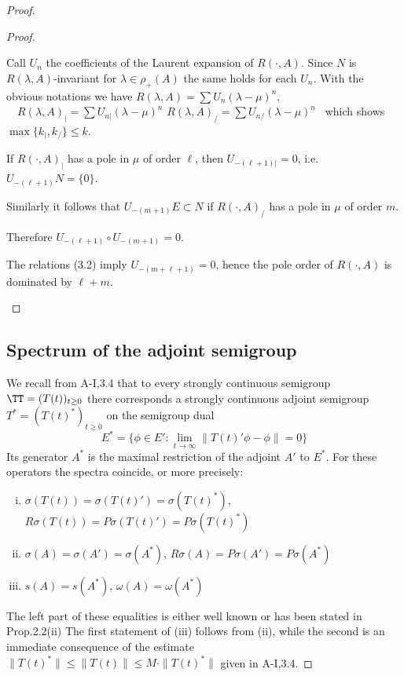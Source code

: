 \begin{proof}
\begin{proof}
\begin{enumerate}[(i)]
Call $U_{n}$ the coefficients of the Laurent expansion of $R(\cdot,A)$.
Since $N$ is $R(\lambda,A)$-invariant for $\lambda \in \rho_{+}(A)$ the same holds for each $U_{n}$.
With the obvious notations we have \quad
$R(\lambda,A) = \sum U_{n}(\lambda-\mu)^{n}$, $\quad R(\lambda,A)_{|} = \sum U_{n|}(\lambda-\mu)^{n}$ \quad {} \quad $R(\lambda,A)_{/} = \sum U_{n/}(\lambda-\mu)^{n}$~
which shows $\max\{k_{|},k_{/}\} \leq k$.

If $R(\cdot,A)_{|}$ has a pole in $\mu$ of order $\ell$, then $U_{-(\ell+1)|} = 0$, i.e. $U_{-(\ell+1)}N = \{0\}$.

Similarly it follows that $U_{-(m+1)}E \subset N$ if $R(\cdot,A)_{/}$ has a pole in $\mu$ of order $m$.

\newpage
Therefore $U_{-(\ell+1)} \circ U_{-(m+1)} = 0$.

The relations (3.2) imply $U_{-(m+\ell+1)} = 0$, hence the pole order of $R(\cdot,A)$ is dominated by $\ell + m$.
\end{enumerate}
\end{proof}

\subsection{Spectrum of the adjoint semigroup}\label{subsec:a3-4.4}

We recall from A-I,3.4 that to every strongly continuous semigroup $\TT = (T(t))_{t \geq 0}$ there corresponds a strongly continuous adjoint semigroup $T^* = (T(t)^*)_{t \geq 0}$ on the semigroup dual
\[
E^* = \{\phi \in E' \colon \lim_{t \to \infty} \|T(t)'\phi-\phi\| = 0\}
\]
Its generator $A^*$ is the maximal restriction of the adjoint $A'$ to $E^*$.
For these operators the spectra coincide, or more precisely:
\begin{enumerate}[(i)]
\item $\sigma(T(t)) = \sigma(T(t)') = \sigma(T(t)^*)$,\\
$R\sigma(T(t)) = P\sigma(T(t)') = P\sigma(T(t)^*)$

\item $\sigma(A) = \sigma(A') = \sigma(A^*)$, $R\sigma(A) = P\sigma(A') = P\sigma(A^*)$

\item $s(A) = s(A^*)$, $\omega(A) = \omega(A^*)$
\end{enumerate}
The left part of these equalities is either well known or has been stated in Prop.2.2(ii)
The first statement of (iii) follows from (ii), while the second is an immediate consequence of the estimate $\|T(t)^*\| \leq \|T(t)\| \leq M\cdot\|T(t)^*\|$ given in A-I,3.4.


\end{proof}

